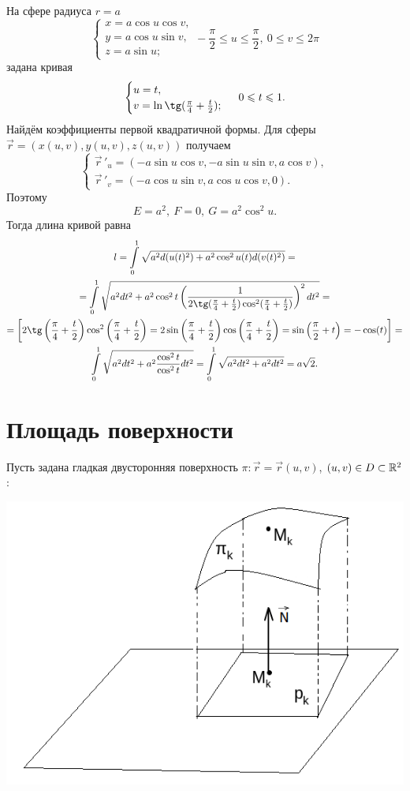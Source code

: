 \documentclass[../../main.tex]{subfiles}
\begin{document}
\begin{exmp}
На сфере радиуса $r = a$
\[\begin{cases}
 x = a\cos u\cos v,\\
 y = a\cos u\sin v,\\
 z = a\sin u;
 \end{cases}
 -\frac{\pi}{2} \leq u \leq \frac{\pi}{2},\ 
 0\leq v \leq 2\pi\]
задана кривая
\[\begin{cases}
u = t,\\
v = \ln\tg(\frac{\pi}{4} + \frac{t}{2});
\end{cases} \ 0 \leq t \leq 1.\]
Найдём коэффициенты первой квадратичной формы. Для 
сферы $\vec{r} = (x(u, v), y(u, v), z(u, v))$ получаем
\[
\begin{cases}
\vec r\,'_u = (-a\sin u\cos v, -a\sin u\sin v, a\cos v),\\
\vec r\,'_v = (-a\cos u\sin v, a\cos u\cos v, 0).
\end{cases}
\]
Поэтому
\[
E = a^2, \ F = 0, \ G = a^2\cos^2u.
\]
Тогда длина кривой равна
\begin{gather*}
l = \int\limits_0^1\sqrt{a^2d(u(t)^2) + 
a^2\cos^2u(t)d(v(t)^2)} =
\\ =
\int\limits_0^1\sqrt{a^2dt^2 + a^2\cos^2t\left(\frac{1}{2\tg(\frac{\pi}{4} + 
\frac{t}{2})\cos^2(\frac{\pi}{4} + \frac{t}{2})}\right)^2dt^2} = \\
= \left[ 2\tg\left(\frac{\pi}{4} + 
\frac{t}{2}\right)\cos^2\left(\frac{\pi}{4} + \frac{t}{2}\right) = 
2\sin\left(\frac{\pi}{4} + 
\frac{t}{2}\right)\cos\left(\frac{\pi}{4} + \frac{t}{2}\right) = 
\sin\left(\frac\pi2 + t\right) = -\cos(t)
\right] =\\
\int\limits_0^1\sqrt{a^2dt^2 + a^2\frac{\cos^2t}{\cos^2t}dt^2} = 
\int\limits_0^1\sqrt{a^2dt^2 + a^2dt^2} = a\sqrt2.
\end{gather*}
\end{exmp}
\section{Площадь поверхности}
Пусть задана гладкая двусторонняя поверхность $\pi : \vec{r} = \vec{r}(u, v)$, 
 $(u, v) \in D \subset \mathbb{R}^2$:

\begin{center}
\includegraphics[scale = 1]{lec22_1.png}
\end{center}
\end{document}
